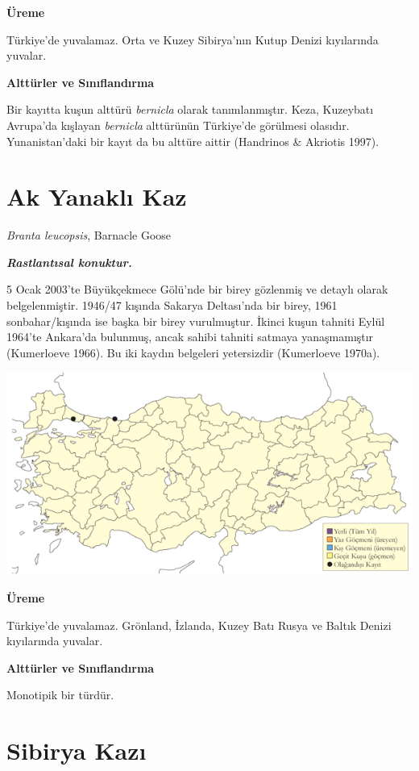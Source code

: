 \documentclass[
  letterpaper,
  DIV=11,
  numbers=noendperiod]{scrreprt}
\begin{document}
\textbf{Üreme}

Türkiye'de yuvalamaz. Orta ve Kuzey Sibirya'nın Kutup Denizi kıyılarında
yuvalar.

\textbf{Alttürler ve Sınıflandırma}

Bir kayıtta kuşun alttürü \emph{bernicla} olarak tanımlanmıştır. Keza,
Kuzeybatı Avrupa'da kışlayan \emph{bernicla} alttürünün Türkiye'de
görülmesi olasıdır. Yunanistan'daki bir kayıt da bu alttüre aittir
(Handrinos \& Akriotis 1997).

\section{Ak Yanaklı Kaz}\label{ak-yanaklux131-kaz}

\emph{Branta leucopsis}, Barnacle Goose

\textbf{\emph{Rastlantısal konuktur.}}

5 Ocak 2003'te Büyükçekmece Gölü'nde bir birey gözlenmiş ve detaylı
olarak belgelenmiştir. 1946/47 kışında Sakarya Deltası'nda bir birey,
1961 sonbahar/kışında ise başka bir birey vurulmuştur. İkinci kuşun
tahniti Eylül 1964'te Ankara'da bulunmuş, ancak sahibi tahniti satmaya
yanaşmamıştır (Kumerloeve 1966). Bu iki kaydın belgeleri yetersizdir
(Kumerloeve 1970a).

\includegraphics{images/harita_Page_006.png}

\textbf{Üreme}

Türkiye'de yuvalamaz. Grönland, İzlanda, Kuzey Batı Rusya ve Baltık
Denizi kıyılarında yuvalar.

\textbf{Alttürler ve Sınıflandırma}

Monotipik bir türdür.

\section{Sibirya Kazı}\label{sibirya-kazux131}
\end{document}
